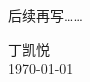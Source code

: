\documentclass[main.tex]{subfiles}
\begin{document}
后续再写……
\begin{flushright}
	丁凯悦\\
	\today
\end{flushright}
\end{document}
